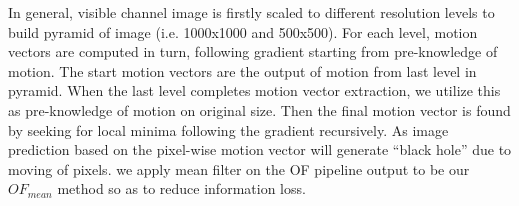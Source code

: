 \documentclass[conference]{IEEEtran}
\begin{document}
In general, visible channel image is firstly scaled to different resolution
levels to build pyramid of image (i.e. 1000x1000 and 500x500). For each level,
motion vectors are computed in turn, following gradient starting from
pre-knowledge of motion. The start motion vectors are the output
of motion from last level in pyramid. When the last level completes
motion vector extraction, we utilize this as pre-knowledge of motion on
original size. Then the final motion vector is found by seeking for local minima
following the gradient recursively. As image prediction based on
the pixel-wise motion vector will generate ``black hole'' due to moving
of pixels. we apply mean filter on the OF pipeline output to be our
$OF_{mean}$ method so as to reduce information loss.
 







\end{document}
